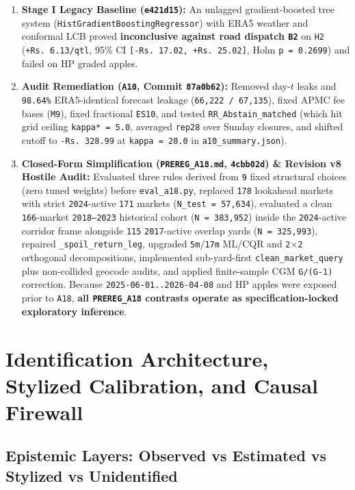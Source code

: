 \documentclass[11pt,a4paper]{article}
\begin{document}
\begin{enumerate}
  \item \textbf{Stage I Legacy Baseline (\texttt{e421d15}):} An unlagged gradient-boosted tree system (\texttt{HistGradientBoostingRegressor}) with ERA5 weather and conformal LCB proved \textbf{inconclusive against road dispatch \texttt{B2}} on \texttt{H2} (\texttt{+Rs.\,6.13/qtl}, 95\% CI \texttt{[-Rs.\,17.02, +Rs.\,25.02]}, Holm \texttt{p = 0.2699}) and failed on HP graded apples.
  \item \textbf{Audit Remediation (\texttt{A10}, Commit \texttt{87a0b62}):} Removed day-$t$ leaks and \texttt{98.64\%} ERA5-identical forecast leakage (\texttt{66,222 / 67,135}), fixed APMC fee bases (\texttt{M9}), fixed fractional \texttt{ES10}, and tested \texttt{RR\_Abstain\_matched} (which hit grid ceiling \texttt{kappa* = 5.0}, averaged \texttt{rep28} over Sunday closures, and shifted cutoff to \texttt{-Rs.\,328.99} at \texttt{kappa = 20.0} in \texttt{a10\_summary.json}).
  \item \textbf{Closed-Form Simplification (\texttt{PREREG\_A18.md}, \texttt{4cbb02d}) \& Revision v8 Hostile Audit:} Evaluated three rules derived from \texttt{9} fixed structural choices (zero tuned weights) before \texttt{eval\_a18.py}, replaced \texttt{178} lookahead markets with strict \texttt{2024}-active \texttt{171} markets (\texttt{N\_test = 57,634}), evaluated a clean \texttt{166}-market \texttt{2018--2023} historical cohort (\texttt{N = 383,952}) inside the \texttt{2024}-active corridor frame alongside \texttt{115} \texttt{2017}-active overlap yards (\texttt{N = 325,993}), repaired \texttt{\_spoil\_return\_leg}, upgraded \texttt{5m}/\texttt{17m} ML/CQR and \texttt{2$\times$2} orthogonal decompositions, implemented sub-yard-first \texttt{clean\_market\_query} plus non-collided geocode audits, and applied finite-sample CGM \texttt{G/(G-1)} correction. Because \texttt{2025-06-01..2026-04-08} and HP apples were exposed prior to \texttt{A18}, \textbf{all \texttt{PREREG\_A18} contrasts operate as specification-locked exploratory inference}.
\end{enumerate}

\section{Identification Architecture, Stylized Calibration, and Causal Firewall}

\subsection{Epistemic Layers: Observed vs Estimated vs Stylized vs Unidentified}
\end{document}
